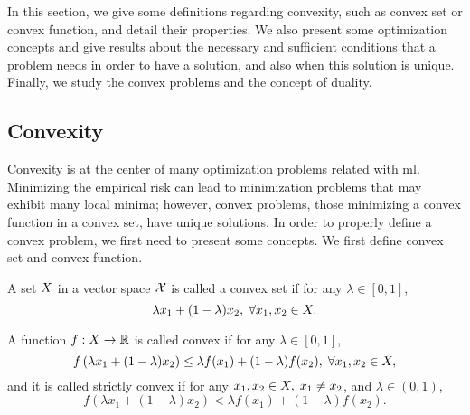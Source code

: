 %

In this section, we give some definitions regarding convexity, such as convex set or convex function, and detail their properties.
%
We also present some optimization concepts and give results about the necessary and sufficient conditions that a problem needs in order to have a solution, and also when this solution is unique.
%
Finally, we study the convex problems and the concept of duality.






\subsection{Convexity}
Convexity is at the center of many optimization problems related with \acrshort{ml}.
Minimizing the empirical risk can lead to minimization problems that may exhibit many local minima; however, convex problems, those minimizing a convex function in a convex set, have unique solutions.
In order to properly define a convex problem, we first need to present some concepts.  
We first define convex set and convex function.
\begin{definition}
    A set $X$ in a vector space $\mathcal{X}$ is called a convex set if for any $\lambda \in [0, 1]$,
    \begin{equation}
        \nonumber
        \lambda x_1 + (1 - \lambda) x_2 , \; \forall x_1, x_2 \in X .
    \end{equation}
\end{definition}

\begin{definition}
    A function $f: X \to \mathbb{R}$ is called convex if for any $\lambda \in [0, 1]$,
    \begin{equation}
        \nonumber
        f\left(\lambda x_1 + (1 - \lambda) x_2 \right) \leq \lambda f(x_1) + (1 - \lambda) f(x_2) , \; \forall x_1, x_2 \in X ,
    \end{equation}
    and it is called strictly convex if for any $x_1, x_2 \in X, \; x_1 \neq x_2$, and $\lambda \in (0, 1)$,
    \begin{equation}
        \nonumber
        f\left(\lambda x_1 + (1 - \lambda) x_2 \right) < \lambda f(x_1) + (1 - \lambda) f(x_2) .
    \end{equation}
\end{definition}

